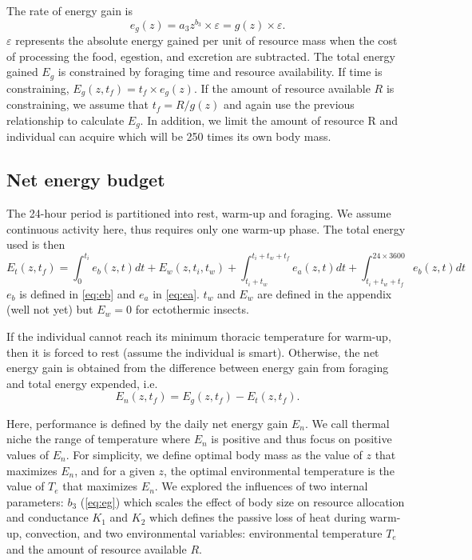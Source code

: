 The rate of energy gain is  
\begin{equation} \label{eq:eg}
	e_g(z) = a_3 z^{b_3} \times \varepsilon  = g(z) \times \varepsilon.
\end{equation}
$\varepsilon$ represents the absolute energy gained per unit of resource mass when the cost of processing the food, egestion, and excretion are subtracted. 
The total energy gained $E_g$ is constrained by foraging time and resource availability.
If time is constraining, $E_g(z, t_f) = t_f \times e_g(z)$.
If the amount of resource available $R$  is constraining, we assume that $t_f = R/g(z)$ and again use the previous relationship to calculate $E_g$.
In addition, we limit the amount of resource R and individual can acquire which will be 250 times its own body mass. %

 
\subsection*{Net energy budget}
The 24-hour period is partitioned into rest, warm-up and foraging.
We assume continuous activity here, thus requires only one warm-up phase. 
The total energy used is then
\begin{equation} \label{eq:et}
	E_t(z, t_f) = \int_0^{t_i} e_b(z, t) dt +  E_w(z,t_i, t_w) + \int_{t_i+ t_w}^{t_i +t_w + t_f} e_a(z,t) dt + \int_{t_i+t_w+t_f}^{24\times 3600} e_b(z, t) dt 
\end{equation}
$e_b$ is defined in \cref{eq:eb}  and $e_a$ in \cref{eq:ea}.
$t_w$  and $E_w$ are defined in the appendix (well not yet)  but $E_w= 0$ for ectothermic insects.
  
If the individual cannot reach its minimum thoracic temperature for warm-up, then it is forced to rest (assume the individual is smart).
Otherwise, the net energy gain is obtained from the  difference between energy gain from foraging and total energy expended, i.e.
\[ 
	E_n(z, t_f) = E_g(z,t_f) - E_t(z, t_f).
\]

Here, performance is defined by the daily net energy gain $E_n$. 
We call thermal niche the range of temperature where $E_n$ is positive and thus focus on positive values of $E_n$. 
For simplicity, we define optimal body mass  as the value of $z$ that maximizes $E_n$, and for a given $z$, the optimal environmental temperature is the value of $T_e$ that maximizes $E_n$.
We explored the influences of two internal parameters: $b_3$ (\cref{eq:eg}) which scales the effect of body size on resource allocation and conductance $K_1$ and $K_2$ which defines the passive loss of heat during warm-up, convection, and two environmental variables: environmental temperature $T_e$ and the amount of resource available $R$.

